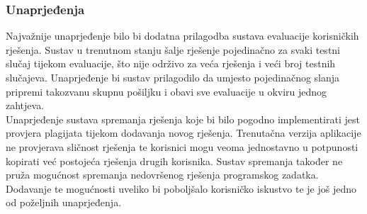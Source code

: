 \documentclass[times, utf8, zavrsni, numeric]{fer}
\begin{document}
	\subsubsection{Unaprjeđenja}
	Najvažnije unaprjeđenje bilo bi dodatna prilagodba sustava evaluacije korisničkih rješenja. Sustav u trenutnom stanju šalje rješenje pojedinačno za svaki testni slučaj tijekom evaluacije, što nije održivo za veća rješenja i veći broj testnih slučajeva. Unaprjeđenje bi sustav prilagodilo da umjesto pojedinačnog slanja pripremi takozvanu skupnu  pošiljku i obavi sve evaluacije u okviru jednog zahtjeva.\\
	Unaprjeđenje sustava spremanja rješenja koje bi bilo pogodno implementirati jest provjera plagijata tijekom dodavanja novog rješenja. Trenutačna verzija aplikacije ne provjerava sličnost rješenja te korisnici mogu veoma jednostavno u potpunosti kopirati već postojeća rješenja drugih korisnika. Sustav spremanja također ne pruža mogućnost spremanja nedovršenog rješenja programskog zadatka. Dodavanje te mogućnosti uveliko bi poboljšalo korisničko iskustvo te je još jedno od poželjnih unaprjeđenja.
	
	
\end{document}
